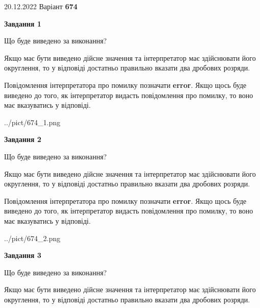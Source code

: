 \documentclass[12pt, ukrainian]{article}
\begin{document}
{20.12.2022 Варіант \No \textbf { 674 }\par}
{
\begin {Large}

{\begin {center}\textbf{Завдання 1}\end {center}}\par
Що буде виведено за виконання? \par

Якщо має бути виведено дійсне значення та інтерпретатор має здійснювати його округлення, 
то у відповіді достатньо правильно вказати два дробових розряди.

Повідомлення інтерпретатора про помилку позначати \textbf{error}.
Якщо щось буде виведено до того, як інтерпретатор видасть повідомлення про помилку, 
то воно має вказуватись у відповіді. \par

\begin{center}
	{../pict/674_1.png}
\end{center}
\newpage

{\begin {center}\textbf{Завдання 2}\end {center}}\par
Що буде виведено за виконання? \par

Якщо має бути виведено дійсне значення та інтерпретатор має здійснювати його округлення, 
то у відповіді достатньо правильно вказати два дробових розряди.

Повідомлення інтерпретатора про помилку позначати \textbf{error}.
Якщо щось буде виведено до того, як інтерпретатор видасть повідомлення про помилку, 
то воно має вказуватись у відповіді. \par

\begin{center}
	{../pict/674_2.png}
\end{center}
\newpage

{\begin {center}\textbf{Завдання 3}\end {center}}\par
Що буде виведено за виконання? \par

Якщо має бути виведено дійсне значення та інтерпретатор має здійснювати його округлення, 
то у відповіді достатньо правильно вказати два дробових розряди.


\end{Large}}
\end{document}

